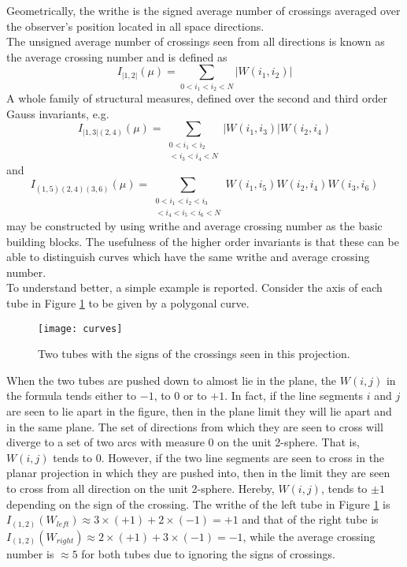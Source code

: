 Geometrically, the writhe is the signed average number of crossings averaged over the observer's position located in all space directions. \\
The unsigned average number of crossings seen from all directions is known as the average crossing number and is defined as
\begin{equation}
 I_{|1,2|}(\mu) = \sum_{0 < i_1 < i_2 < N} |W(i_1, i_2)|
\end{equation}
A whole family of structural measures, defined over the second and third order Gauss invariants, e.g. 
\begin{equation}
 I_{|1,3|(2,4)}(\mu) = \sum_{\substack{0 < i_1 < i_2 \\ 
			     < i_3 < i_4 < N}} |W(i_1, i_3)|W(i_2, i_4)
\end{equation}
and
\begin{equation}
I_{(1,5)(2,4)(3,6)}(\mu) = \sum_{\substack{0 < i_1 < i_2 < i_3 \\ 
				< i_4 < i_5 < i_6 < N}} W(i_1, i_5)W(i_2, i_4)W(i_3, i_6)
\end{equation}
may be constructed by using writhe and average crossing number as the basic building blocks. The usefulness of the higher order invariants is that these can be able to distinguish curves which have the same writhe and average crossing number.\\
To understand better, a simple example is reported. Consider the axis of each tube in Figure \ref{fig:curves} to be given by a polygonal curve. 
\begin{figure}[tb]
	\begin{center}
		\texttt{[image: curves]}
		\caption[Two tubes with the signs of the crossings seen in this projection]{Two tubes with the signs of the crossings seen in this projection.}
		\label{fig:curves}
	\end{center}
\end{figure}
When the two tubes are pushed down to almost lie in the plane, the $W(i, j)$ in the formula tends either to $-1$, to $0$ or to $+1$. In fact, if the line segments $i$ and $j$ are seen to lie apart in the figure, then in the plane limit they will lie apart and in the same plane. The set of directions from which they are seen to cross will diverge to a set of two arcs with measure $0$ on the unit 2-sphere. That is, $W(i, j)$ tends to $0$. However, if the two line segments are seen to cross in the planar projection in which they are pushed into, then in the limit they are seen to cross from all direction on the unit 2-sphere. Hereby, $W(i, j)$, tends to $\pm1$ depending on the sign of the crossing. The writhe of the left tube in Figure \ref{fig:curves} is $I_{(1,2)}(W_{left}) \approx 3 \times (+1) + 2 \times (-1) = +1$ and that of the right tube is $I_{(1,2)}(W_{right}) \approx 2 \times (+1) + 3 \times (-1) = -1$, while the average crossing number is $\approx 5$ for both tubes due to ignoring the signs of crossings.


\cleardoublepage